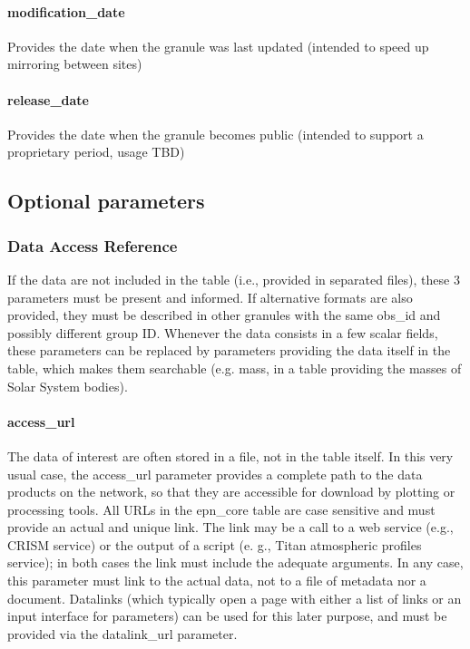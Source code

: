 \documentclass[11pt,a4paper]{ivoa}
\begin{document}
\paragraph{modification\_date}

Provides the date when the granule was last updated (intended to speed up mirroring between sites)

\paragraph{release\_date}

Provides the date when the granule becomes public (intended to support a proprietary period, usage TBD)


\subsection{Optional parameters}

\subsubsection{Data Access Reference}

If the data are not included in the table (i.e., provided in separated files), these 3 parameters must be present and informed. If alternative formats are also provided, they must be described in other granules with the same obs\_id and possibly different group ID. Whenever the data consists in a few scalar fields, these parameters can be replaced by parameters providing the data itself in the table, which makes them searchable (e.g. mass, in a table providing the masses of Solar System bodies).

\paragraph{access\_url}

The data of interest are often stored in a file, not in the table itself. In this very usual case, the access\_url parameter provides a complete path to the data products on the network, so that they are accessible for download by plotting or processing tools. All URLs in the epn\_core table are case sensitive and must provide an actual and unique link. The link may be a call to a web service (e.g., CRISM service) or the output of a script (e. g., Titan atmospheric profiles service); in both cases the link must include the adequate arguments. In any case, this parameter must link to the actual data, not to a file of metadata nor a document. Datalinks (which typically open a page with either a list of links or an input interface for parameters) can be used for this later purpose, and must be provided via the datalink\_url parameter. 
\end{document}
